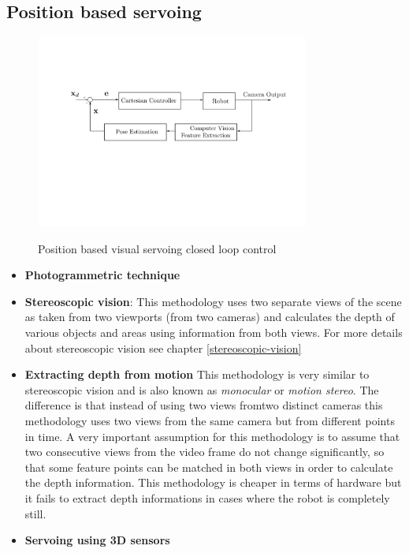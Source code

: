 \subsection{Position based servoing}

\begin{center}
\begin{figure}[H]
\centering
\includegraphics[width=0.8\textwidth]{images/visual-servoing-position-based.png}\\
\caption{Position based visual servoing closed loop control}
\end{figure}
\end{center}

\begin{itemize}
\item \textbf{Photogrammetric technique}
\item \textbf{Stereoscopic vision}: This methodology uses two separate views of the scene as taken from two viewports (from two cameras) 
and calculates the depth of various objects and areas using information from both views. For more details about stereoscopic vision see chapter \ref{stereoscopic-vision}
\item \textbf{Extracting depth from motion} This methodology is very similar to stereoscopic vision and is also known as \textit{monocular} or \textit{motion stereo}. The difference is that instead of using two views fromtwo distinct cameras this methodology 
uses two views from the same camera but from different points in time. A very important assumption for this methodology is to assume that two consecutive views from the video frame do not change significantly, so that some feature points can be matched in both views in order to calculate the depth information. This methodology 
is cheaper in terms of hardware but it fails to extract depth informations in cases where the robot is completely still.
\item \textbf{Servoing using 3D sensors}
\end{itemize}

